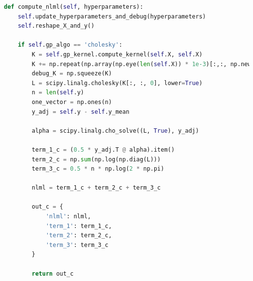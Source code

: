 \begin{lstlisting}[caption={Method used to calculate the Negative Log Marginal Likelihood (NLML).} language=Python,label={lst:NLML}]
    def compute_nlml(self, hyperparameters):
    self.update_hyperparameters_and_debug(hyperparameters)
    self.reshape_X_and_y()

    if self.gp_algo == 'cholesky':
        K = self.gp_kernel.compute_kernel(self.X, self.X)
        K += np.repeat(np.array(np.eye(len(self.X)) * 1e-3)[:,:, np.newaxis], self.X.shape[1], axis=2)
        debug_K = np.squeeze(K)
        L = scipy.linalg.cholesky(K[:, :, 0], lower=True)
        n = len(self.y)
        one_vector = np.ones(n)
        y_adj = self.y - self.y_mean

        alpha = scipy.linalg.cho_solve((L, True), y_adj)

        term_1_c = (0.5 * y_adj.T @ alpha).item()
        term_2_c = np.sum(np.log(np.diag(L)))
        term_3_c = 0.5 * n * np.log(2 * np.pi)

        nlml = term_1_c + term_2_c + term_3_c

        out_c = {
            'nlml': nlml,
            'term_1': term_1_c,
            'term_2': term_2_c,
            'term_3': term_3_c
        }

        return out_c

\end{lstlisting}


